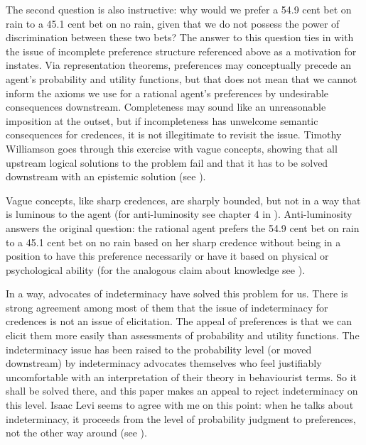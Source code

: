 The second question is also instructive: why would we
prefer a 54.9 cent bet on rain to a 45.1 cent bet on no
rain, given that we do not possess the power of
discrimination between these two bets? The answer to
this question ties in with the issue of incomplete
preference structure referenced above as a motivation
for instates. Via representation theorems, preferences
may conceptually precede an agent's probability and
utility functions, but that does not mean that we
cannot inform the axioms we use for a rational agent's
preferences by undesirable consequences downstream.
Completeness may sound like an unreasonable imposition
at the outset, but if incompleteness has unwelcome
semantic consequences for credences, it is not
illegitimate to revisit the issue. Timothy Williamson
goes through this exercise with vague concepts, showing
that all upstream logical solutions to the problem fail
and that it has to be solved downstream with an
epistemic solution (see ).

Vague concepts, like sharp credences, are sharply
bounded, but not in a way that is luminous to the agent
(for anti-luminosity see chapter 4 in
). Anti-luminosity answers the
original question: the rational agent prefers the 54.9
cent bet on rain to a 45.1 cent bet on no rain based on
her sharp credence without being in a position to have
this preference necessarily or have it based on
physical or psychological ability (for the analogous
claim about knowledge see ).

In a way, advocates of indeterminacy have solved this
problem for us. There is strong agreement among most of
them that the issue of indeterminacy for credences is
not an issue of elicitation. The appeal of preferences
is that we can elicit them more easily than assessments
of probability and utility functions. The indeterminacy
issue has been raised to the probability level (or
moved downstream) by indeterminacy advocates themselves
who feel justifiably uncomfortable with an
interpretation of their theory in behaviourist terms.
So it shall be solved there, and this paper makes an
appeal to reject indeterminacy on this level. Isaac
Levi seems to agree with me on this point: when he
talks about indeterminacy, it proceeds from the level
of probability judgment to preferences, not the other
way around (see ).


